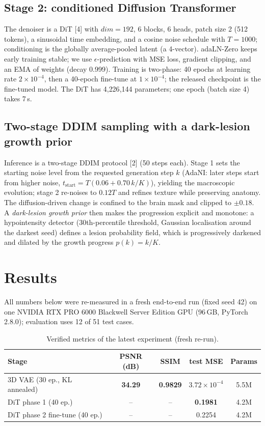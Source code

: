 \documentclass[runningheads]{llncs}
\begin{document}
\subsection{Stage 2: conditioned Diffusion Transformer}
\label{sec:dit}
The denoiser is a DiT [4] with $dim{=}192$, 6 blocks, 6 heads, patch size 2 (512 tokens), a sinusoidal time embedding, and a cosine noise schedule with $T{=}1000$; conditioning is the globally average-pooled latent (a 4-vector). adaLN-Zero keeps early training stable; we use $\epsilon$-prediction with MSE loss, gradient clipping, and an EMA of weights (decay 0.999). Training is two-phase: 40 epochs at learning rate $2{\times}10^{-4}$, then a 40-epoch fine-tune at $1{\times}10^{-4}$; the released checkpoint is the fine-tuned model. The DiT has 4{,}226{,}144 parameters; one epoch (batch size 4) takes 7\,s.

\subsection{Two-stage DDIM sampling with a dark-lesion growth prior}
\label{sec:sample}
Inference is a two-stage DDIM protocol [2] (50 steps each). Stage 1 sets the starting noise level from the requested generation step $k$ (AdaNI: later steps start from higher noise, $t_{\mathrm{start}}=T(0.06+0.70\,k/K)$), yielding the macroscopic evolution; stage 2 re-noises to $0.12T$ and refines texture while preserving anatomy. The diffusion-driven change is confined to the brain mask and clipped to $\pm0.18$. A \emph{dark-lesion growth prior} then makes the progression explicit and monotone: a hypointensity detector (30th-percentile threshold, Gaussian localisation around the darkest seed) defines a lesion probability field, which is progressively darkened and dilated by the growth progress $p(k)=k/K$.

\section{Results}
\label{sec:results}
All numbers below were re-measured in a fresh end-to-end run (fixed seed 42) on one NVIDIA RTX PRO 6000 Blackwell Server Edition GPU (96\,GB, PyTorch 2.8.0); evaluation uses 12 of 51 test cases.

\begin{table}[t]
\centering
\caption{Verified metrics of the latest experiment (fresh re-run).}
\label{tab:metrics}
\begin{tabular}{lcccc}
\toprule
Stage & PSNR (dB) & SSIM & test MSE & Params \\
\midrule
3D VAE (30 ep., KL annealed) & \textbf{34.29} & \textbf{0.9829} & $3.72{\times}10^{-4}$ & 5.5M \\
DiT phase 1 (40 ep.) & -- & -- & \textbf{0.1981} & 4.2M \\
DiT phase 2 fine-tune (40 ep.) & -- & -- & 0.2254 & 4.2M \\
\bottomrule
\end{tabular}
\end{table}
\end{document}
